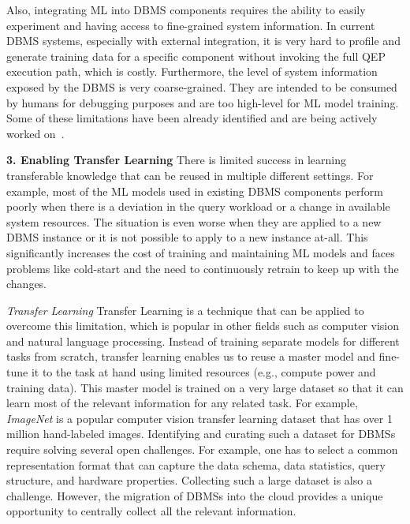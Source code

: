 Also, integrating ML into DBMS components requires the ability to easily experiment and having access to fine-grained system information.
In current DBMS systems, especially with external integration, it is very hard to profile and generate training data for a specific component without invoking the full QEP execution path, which is costly.
Furthermore, the level of system information exposed by the DBMS is very coarse-grained.
They are intended to be consumed by humans for debugging purposes and are too high-level for ML model training.
Some of these limitations have been already identified and are being actively worked on~\cite{noisepage}.

\vspace{2mm}
\noindent \textbf{3. Enabling Transfer Learning} There is limited success in learning transferable knowledge that can be reused in multiple different settings.
For example, most of the ML models used in existing DBMS components perform poorly when there is a deviation in the query workload or a change in available system resources.
The situation is even worse when they are applied to a new DBMS instance or it is not possible to apply to a new instance at-all.
This significantly increases the cost of training and maintaining ML models and faces problems like cold-start and the need to continuously retrain to keep up with the changes.

\textit{Transfer Learning} Transfer Learning is a technique that can be applied to overcome this limitation, which is popular in other fields such as computer vision and natural language processing.
Instead of training separate models for different tasks from scratch, transfer learning enables us to reuse a master model and fine-tune it to the task at hand using limited resources (e.g., compute power and training data).
This master model is trained on a very large dataset so that it can learn most of the relevant information for any related task.
For example, \textit{ImageNet} is a popular computer vision transfer learning dataset that has over 1 million hand-labeled images.
Identifying and curating such a dataset for DBMSs require solving several open challenges.
For example, one has to select a common representation format that can capture the data schema, data statistics, query structure, and hardware properties.
Collecting such a large dataset is also a challenge.
However, the migration of DBMSs into the cloud provides a unique opportunity to centrally collect all the relevant information.